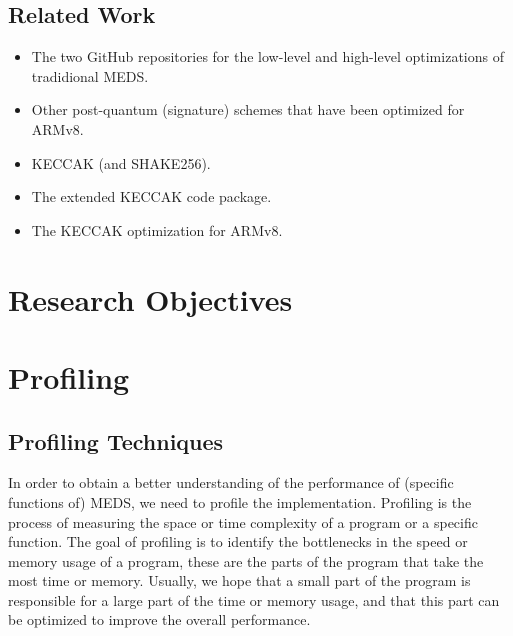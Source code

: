 \documentclass[11pt,a4paper]{report}
\theoremstyle{definition}
\begin{document}
\section{Related Work}
\begin{itemize}
  \item The two GitHub repositories for the low-level and high-level optimizations of tradidional MEDS.
  \item Other post-quantum (signature) schemes that have been optimized for ARMv8.
  \item KECCAK (and SHAKE256).
  \item The extended KECCAK code package.
  \item The KECCAK optimization for ARMv8.
\end{itemize}

\chapter{Research Objectives}
\label{ch:researchobjectives}

\chapter{Profiling}
\label{ch:profiling}
\section{Profiling Techniques}
In order to obtain a better understanding of the performance of (specific functions of) MEDS, we need to profile the implementation. Profiling is the process of measuring the space or time complexity of a program or a specific function. The goal of profiling is to identify the bottlenecks in the speed or memory usage of a program, these are the parts of the program that take the most time or memory. Usually, we hope that a small part of the program is responsible for a large part of the time or memory usage, and that this part can be optimized to improve the overall performance.
\end{document}
